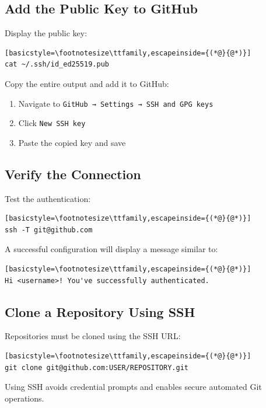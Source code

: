 \subsection{Add the Public Key to GitHub}

Display the public key:

\begin{lstlisting}[basicstyle=\footnotesize\ttfamily,escapeinside={(*@}{@*)}]
cat ~/.ssh/id_ed25519.pub
\end{lstlisting}

Copy the entire output and add it to GitHub:

\begin{enumerate}
\item Navigate to \texttt{GitHub → Settings → SSH and GPG keys}
\item Click \texttt{New SSH key}
\item Paste the copied key and save
\end{enumerate}

\subsection{Verify the Connection}

Test the authentication:

\begin{lstlisting}[basicstyle=\footnotesize\ttfamily,escapeinside={(*@}{@*)}]
ssh -T git@github.com
\end{lstlisting}

A successful configuration will display a message similar to:

\begin{lstlisting}[basicstyle=\footnotesize\ttfamily,escapeinside={(*@}{@*)}]
Hi <username>! You've successfully authenticated.
\end{lstlisting}

\subsection{Clone a Repository Using SSH}

Repositories must be cloned using the SSH URL:

\begin{lstlisting}[basicstyle=\footnotesize\ttfamily,escapeinside={(*@}{@*)}]
git clone git@github.com:USER/REPOSITORY.git
\end{lstlisting}

Using SSH avoids credential prompts and enables secure automated
Git operations.

